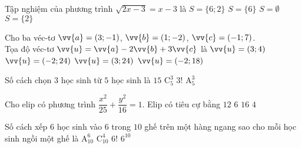 \begin{ex}%
	Tập nghiệm của phương trình $\sqrt{2x-3}=x-3$ là
	\choice
	{$S=\{6;2\}$}
	{\True $S=\{6\}$}
	{$S=\emptyset$}
	{$S=\{2\}$}
\end{ex}
\begin{ex}%
	Cho ba véc-tơ $\vv{a}=(3;-1)$, $\vv{b}=(1;-2)$, $\vv{c}=(-1;7)$.\\
	Tọa độ véc-tơ $\vv{u}=\vv{a}-2\vv{b}+3\vv{c}$ là
	\choice
	{$\vv{u}=(3;4)$}
	{\True $\vv{u}=(-2;24)$}
	{$\vv{u}=(3;24)$}
	{$\vv{u}=(-2;18)$}
\end{ex}
\begin{ex}%
	Số cách chọn $3$ học sinh từ $5$ học sinh là
	\choice
	{$15$}
	{\True $\mathrm{C}_5^3$}
	{$3!$}
	{$\mathrm{A}_5^3$}
	\loigiai{
	}
\end{ex}
\begin{ex}%
	Cho elip có phương trình $\dfrac{x^2}{25}+\dfrac{y^2}{16}=1$. Elip có tiêu cự bằng
	\choice
	{$12$}
	{\True 	$6$}
	{$16$}
	{$4$}
\end{ex}
\begin{ex}%
	Số cách xếp $6$ học sinh vào $6$ trong $10$ ghế trên một hàng ngang sao cho mỗi học sinh ngồi một ghế là
	\choice
	{\True $\mathrm{A}_{10}^6$}
	{$\mathrm{C}_{10}^4$}
	{$6!$}
	{$6^{10}$}
\end{ex}
